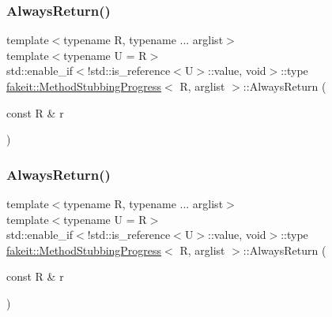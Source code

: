 \subsubsection{\texorpdfstring{AlwaysReturn()}{AlwaysReturn()}\hspace{0.1cm}{\footnotesize\ttfamily [6/27]}}
{\footnotesize\ttfamily template$<$typename R, typename ... arglist$>$ \\
template$<$typename U  = R$>$ \\
std\+::enable\+\_\+if$<$!std\+::is\+\_\+reference$<$U$>$\+::value, void$>$\+::type \mbox{\hyperlink{structfakeit_1_1MethodStubbingProgress}{fakeit\+::\+Method\+Stubbing\+Progress}}$<$ R, arglist $>$\+::Always\+Return (\begin{DoxyParamCaption}\item[{const R \&}]{r }\end{DoxyParamCaption})\hspace{0.3cm}{\ttfamily [inline]}}

\mbox{\label{structfakeit_1_1MethodStubbingProgress_a268ca122b518c0a34e80535d8f457549}} 
\subsubsection{\texorpdfstring{AlwaysReturn()}{AlwaysReturn()}\hspace{0.1cm}{\footnotesize\ttfamily [7/27]}}
{\footnotesize\ttfamily template$<$typename R, typename ... arglist$>$ \\
template$<$typename U  = R$>$ \\
std\+::enable\+\_\+if$<$!std\+::is\+\_\+reference$<$U$>$\+::value, void$>$\+::type \mbox{\hyperlink{structfakeit_1_1MethodStubbingProgress}{fakeit\+::\+Method\+Stubbing\+Progress}}$<$ R, arglist $>$\+::Always\+Return (\begin{DoxyParamCaption}\item[{const R \&}]{r }\end{DoxyParamCaption})\hspace{0.3cm}{\ttfamily [inline]}}

\mbox{\label{structfakeit_1_1MethodStubbingProgress_a84cf6a4bf307cf8d49efb69b014e9b11}} 
